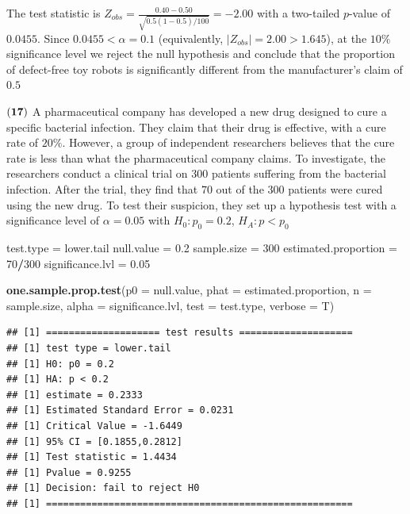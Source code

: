\documentclass[
]{article}
\newenvironment{Shaded}{\begin{snugshade}}{\end{snugshade}}
\newcommand{\AttributeTok}[1]{\textcolor[rgb]{0.13,0.29,0.53}{#1}}
\newcommand{\DecValTok}[1]{\textcolor[rgb]{0.00,0.00,0.81}{#1}}
\newcommand{\FloatTok}[1]{\textcolor[rgb]{0.00,0.00,0.81}{#1}}
\newcommand{\FunctionTok}[1]{\textcolor[rgb]{0.13,0.29,0.53}{\textbf{#1}}}
\newcommand{\NormalTok}[1]{#1}
\newcommand{\OtherTok}[1]{\textcolor[rgb]{0.56,0.35,0.01}{#1}}
\newcommand{\SpecialCharTok}[1]{\textcolor[rgb]{0.81,0.36,0.00}{\textbf{#1}}}
\newcommand{\StringTok}[1]{\textcolor[rgb]{0.31,0.60,0.02}{#1}}
\begin{document}
{The test statistic is
\(Z_{obs} = \frac{0.40 - 0.50}{\sqrt{0.5(1-0.5)/100}} = -2.00\) with a
two-tailed \(p\)-value of \(0.0455\). Since \(0.0455 < \alpha = 0.1\)
(equivalently, \(|Z_{obs}| = 2.00 > 1.645\)), at the \(10\%\)
significance level we reject the null hypothesis and conclude that the
proportion of defect-free toy robots is significantly different from the
manufacturer's claim of \(0.5\) }

\(\bf (17)\) A pharmaceutical company has developed a new drug designed
to cure a specific bacterial infection. They claim that their drug is
effective, with a cure rate of \(20\%\). However, a group of independent
researchers believes that the cure rate is less than what the
pharmaceutical company claims. To investigate, the researchers conduct a
clinical trial on \(300\) patients suffering from the bacterial
infection. After the trial, they find that \(70\) out of the \(300\)
patients were cured using the new drug. To test their suspicion, they
set up a hypothesis test with a significance level of \(\alpha = 0.05\)
with \(H_0: p_0 = 0.2\), \(H_A: p < p_0\)

\begin{Shaded}
\begin{Highlighting}[]
\NormalTok{test.type }\OtherTok{=} \StringTok{\textquotesingle{}lower.tail\textquotesingle{}}
\NormalTok{null.value }\OtherTok{=} \FloatTok{0.2}
\NormalTok{sample.size }\OtherTok{=} \DecValTok{300}
\NormalTok{estimated.proportion }\OtherTok{=} \DecValTok{70}\SpecialCharTok{/}\DecValTok{300}
\NormalTok{significance.lvl }\OtherTok{=} \FloatTok{0.05}

\FunctionTok{one.sample.prop.test}\NormalTok{(}\AttributeTok{p0 =}\NormalTok{ null.value,}
                     \AttributeTok{phat =}\NormalTok{ estimated.proportion,}
                     \AttributeTok{n =}\NormalTok{ sample.size,}
                     \AttributeTok{alpha =}\NormalTok{ significance.lvl,}
                     \AttributeTok{test =}\NormalTok{ test.type,}
                     \AttributeTok{verbose =}\NormalTok{ T)}
\end{Highlighting}
\end{Shaded}

\begin{verbatim}
## [1] ==================== test results ====================
## [1] test type = lower.tail
## [1] H0: p0 = 0.2
## [1] HA: p < 0.2
## [1] estimate = 0.2333
## [1] Estimated Standard Error = 0.0231
## [1] Critical Value = -1.6449
## [1] 95% CI = [0.1855,0.2812]
## [1] Test statistic = 1.4434
## [1] Pvalue = 0.9255
## [1] Decision: fail to reject H0
## [1] ======================================================
\end{verbatim}
\end{document}
